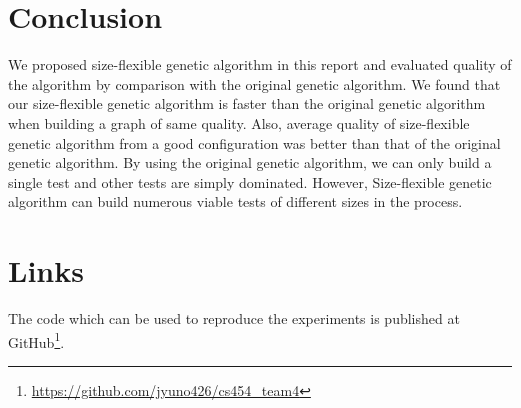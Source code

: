 \documentclass[a4paper, 10pt, conference]{ieeeconf}      %
\begin{document}
\section{Conclusion}
We proposed size-flexible genetic algorithm in this report and evaluated quality of the algorithm by comparison with the original genetic algorithm. We found that our size-flexible genetic algorithm is faster than the original genetic algorithm when building a graph of same quality. Also, average quality of size-flexible genetic algorithm from a good configuration was better than that of the original genetic algorithm. By using the original genetic algorithm, we can only build a single test and other tests are simply dominated. However, Size-flexible genetic algorithm can build numerous viable tests of different sizes in the process.


\section{Links}
The code which can be used to reproduce the experiments is published at
GitHub\footnote{\url{https://github.com/jyuno426/cs454_team4}}.

\addtolength{\textheight}{0cm}   %

\end{document}
